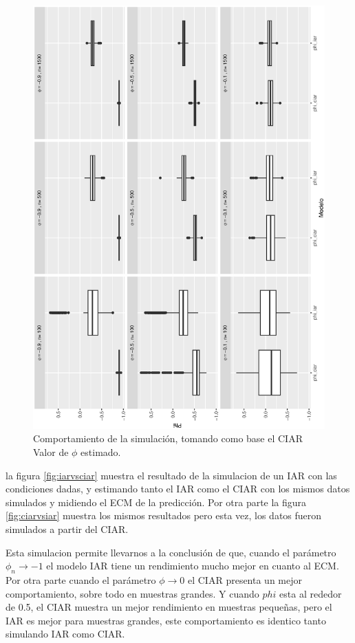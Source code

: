 \begin{figure}[h]
\begin{minipage}{0.45\textwidth}
    \includegraphics[width=0.75\linewidth,angle = 270]{Kap3/Fig_Cap3/sim4_CIARvsIARphi.eps}
    \caption{Comportamiento de la simulación, tomando como base el CIAR Valor de $\phi$ estimado.}
    \label{fig:ciarvsiarphi}
    \end{minipage}
\end{figure}

la figura \ref{fig:iarvsciar} muestra el resultado de la simulacion de un IAR con las condiciones dadas, y estimando tanto  el IAR como el CIAR
con los mismos datos simulados y midiendo el ECM de la predicción. Por otra parte la figura \ref{fig:ciarvsiar} muestra los mismos resultados pero esta vez,
los datos fueron simulados a partir del CIAR.

Esta simulacion permite llevarnos a la conclusión de que, cuando el parámetro $\phi_n \to -1$ el modelo IAR tiene un rendimiento mucho mejor en cuanto al ECM. 
Por otra parte cuando el parámetro $\phi \to 0$ el CIAR presenta un mejor comportamiento, sobre todo en muestras grandes. Y cuando $phi$ esta al rededor de 0.5, el CIAR muestra
un mejor rendimiento en muestras pequeñas, pero el IAR es mejor para muestras grandes, este comportamiento es identico tanto simulando IAR como CIAR.

